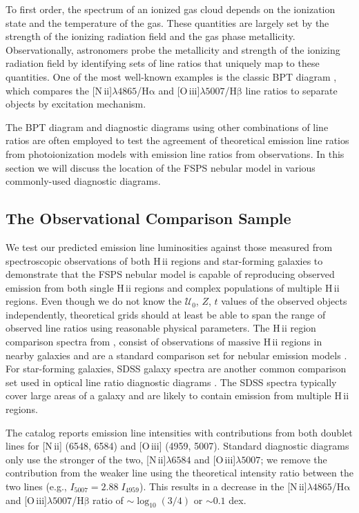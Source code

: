 \documentclass[trackchanges, twocolumn, tighten]{aastex61}
\newcommand{\FSPS}{{\sc FSPS}\xspace}
\newcommand{\logten}{\ensuremath{\log_{10}}}
\newcommand{\nii}{[N\,{\sc ii}]\xspace}
\newcommand{\oiii}{[O\,{\sc iii}]\xspace}
\newcommand{\ha}{\ensuremath{\mathrm{H\alpha}}}
\newcommand{\hb}{\ensuremath{\mathrm{H\beta}}}
\newcommand{\hii}{H\,{\sc ii}\xspace}
\newcommand\lam[1]{\ensuremath{\lambda #1}}
\newcommand{\U}{\ensuremath{\mathcal{U}_{0}}}
\newcommand\niiha{\nii{}\lam{4865}/\ha{}}
\newcommand\oiiihb{\oiii{}\lam{5007}/\hb{}}
\begin{document}
To first order, the spectrum of an ionized gas cloud depends on the ionization state and the temperature of the gas. These quantities are largely set by the strength of the ionizing radiation field and the gas phase metallicity. Observationally, astronomers probe the metallicity and strength of the ionizing radiation field by identifying sets of line ratios that uniquely  map to these quantities. One of the most well-known examples is the classic BPT diagram \citep{BPT}, which compares the \niiha{} and \oiiihb{} line ratios to separate objects by excitation mechanism.

The BPT diagram and diagnostic diagrams using other combinations of line ratios are often employed to test the agreement of theoretical emission line ratios from photoionization models with emission line ratios from observations. In this section we will discuss the location of the \FSPS nebular model in various commonly-used diagnostic diagrams.

\subsection{The Observational Comparison Sample}

We test our predicted emission line luminosities against those measured from spectroscopic observations of both \hii regions and star-forming galaxies to demonstrate that the \FSPS nebular model is capable of reproducing observed emission from both single \hii regions and complex populations of multiple \hii regions. Even though we do not know the \U{}, $Z$, $t$ values of the observed objects independently, theoretical grids should at least be able to span the range of observed line ratios using reasonable physical parameters.  The \hii region comparison spectra from \citet{vanzee98}, consist of observations of massive \hii regions in nearby galaxies and are a standard comparison set for nebular emission models \citep{Dopita00, Kewley06, Levesque10, Dopita13}. For star-forming galaxies, SDSS galaxy spectra are another common comparison set used in optical line ratio diagnostic diagrams \citep{Dopita00, Kewley06, Levesque10}. The SDSS spectra typically cover large areas of a galaxy and are likely to contain emission from multiple \hii regions.

The \citet{vanzee98} catalog reports emission line intensities with contributions from both doublet lines for \nii{} (6548, 6584) and \oiii{} (4959, 5007). Standard diagnostic diagrams only use the stronger of the two, \nii{}\lam{6584} and \oiii{}\lam{5007}; we remove the contribution from the weaker line using the theoretical intensity ratio between the two lines (e.g., $I_{5007} = 2.88\;I_{4959}$). This results in a decrease in the \niiha{} and \oiiihb{} ratio of $\sim \logten \left(3/4\right)$ or $\sim 0.1$ dex.
\end{document}
